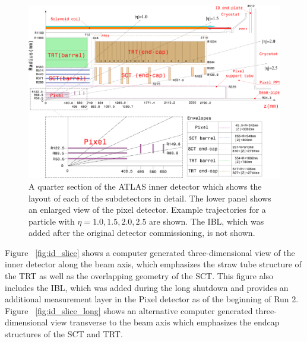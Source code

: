 \begin{figure}[hbtp]
\includegraphics[width=\fullfig]{figures/id_detail_schematic.pdf}
\caption{A quarter section of the \ac{ATLAS} inner detector which shows the layout of each of the subdetectors in detail. The lower panel shows an enlarged view of the pixel detector. Example trajectories for a particle with $\eta = 1.0, 1.5, 2.0, 2.5$ are shown. The \ac{IBL}, which was added after the original detector commissioning, is not shown.}
\label{fig:id_detail_schematic}
\end{figure}

Figure ~\ref{fig:id_slice} shows a computer generated three-dimensional view of the inner detector along the beam axis, which emphasizes the straw tube structure of the \ac{TRT} as well as the overlapping geometry of the \ac{SCT}.
This figure also includes the \ac{IBL}, which was added during the long shutdown and provides an additional measurement layer in the Pixel detector as of the beginning of Run 2. 
Figure ~\ref{fig:id_slice_long} shows an alternative computer generated three-dimensional view transverse to the beam axis which emphasizes the endcap structures of the \ac{SCT} and \ac{TRT}. 

